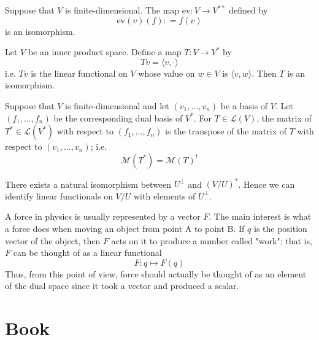 \documentclass{report}
\begin{document}
        \begin{thBox}
        Suppose that $V$ is finite-dimensional. The map $\text{ev}: V \rightarrow V^{**}$ defined by
        $$
        \text{ev}(v)(f): = f(v)
        $$
        is an isomorphism.
        \end{thBox}

        \begin{thBox}
        Let $V$ be an inner product space. Define a map $T: V \rightarrow V^{*}$ by
        $$
        T v = \langle v, \cdot \rangle
        $$
        i.e. $T v$ is the linear functional on $V$ whose value on $w \in V$ is $\langle v, w \rangle$. Then $T$ is an isomorphism.
        \end{thBox}

        \begin{thBox}
        Suppose that $V$ is finite-dimensional and let $\left(v_{1}, \ldots, v_{n}\right)$ be a basis of $V$. Let $\left(f_{1}, \ldots, f_{n}\right)$ be the corresponding dual basis of $V^{*}$. For $T \in \mathcal{L}(V)$, the matrix of $T^{*} \in \mathcal{L}(V^{*})$ with respect to $\left(f_{1}, \ldots, f_{n}\right)$ is the transpose of the matrix of $T$ with respect to $\left(v_{1}, \ldots, v_{n}\right)$; i.e.
        $$
        \mathcal{M}(T^{*}) = \mathcal{M}(T)^{t}
        $$
        \end{thBox}

        \begin{thBox}
        There exists a natural isomorphism between $U^{\perp}$ and $(V / U)^{*}$. Hence we can identify linear functionals on $V / U$ with elements of $U^{\perp}$.
        \end{thBox}

        \begin{Example}
        A force in physics is usually represented by a vector $F$. The main interest is what a force does when moving an object from point A to point B. If $q$ is the position vector of the object, then $F$ acts on it to produce a number called "work"; that is, $F$ can be thought of as a linear functional
        $$
        F: q \mapsto F(q)
        $$
        Thus, from this point of view, force should actually be thought of as an element of the dual space since it took a vector and produced a scalar.
        \end{Example}

    \section{Book}
\end{document}
